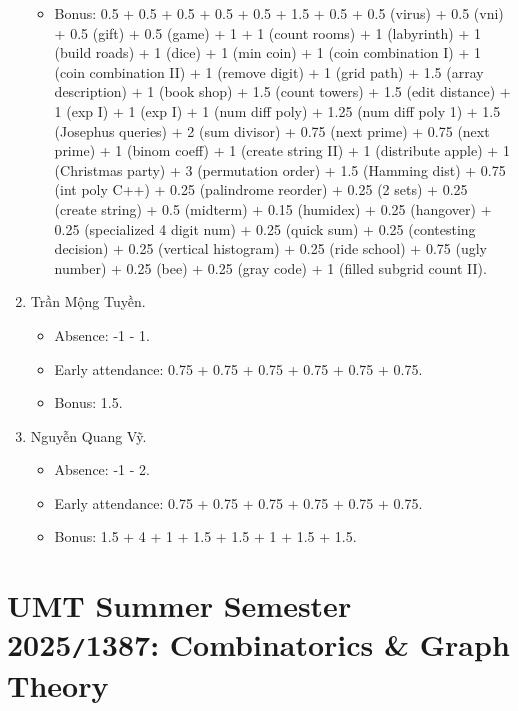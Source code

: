 \documentclass{article}
\begin{document}
\begin{enumerate}
\begin{itemize}
		\item Bonus: 0.5 + 0.5 + 0.5 + 0.5 + 0.5 + 1.5 + 0.5 + 0.5 (virus) + 0.5 (vni) + 0.5 (gift) + 0.5 (game) + 1 + 1 (count rooms) + 1 (labyrinth) + 1 (build roads) + 1 (dice) + 1 (min coin) + 1 (coin combination I) + 1 (coin combination II) + 1 (remove digit) + 1 (grid path) + 1.5 (array description) + 1 (book shop) + 1.5 (count towers) + 1.5 (edit distance) + 1 (exp I) + 1 (exp I) + 1 (num diff poly) + 1.25 (num diff poly 1) + 1.5 (Josephus queries) + 2 (sum divisor) + 0.75 (next prime) + 0.75 (next prime) + 1 (binom coeff) + 1 (create string II) + 1 (distribute apple) + 1 (Christmas party) + 3 (permutation order) + 1.5 (Hamming dist) + 0.75 (int poly C++)  + 0.25 (palindrome reorder) + 0.25 (2 sets) + 0.25 (create string) + 0.5 (midterm) + 0.15 (humidex) + 0.25 (hangover) + 0.25 (specialized 4 digit num) + 0.25 (quick sum)  + 0.25 (contesting decision) + 0.25 (vertical histogram) + 0.25 (ride school) + 0.75 (ugly number) + 0.25 (bee) + 0.25 (gray code) + 1 (filled subgrid count II).
	\end{itemize}
	\item {\sc Trần Mộng Tuyền.}
	\begin{itemize}
		\item Absence: -1 - 1.
		\item Early attendance: 0.75 + 0.75 + 0.75 + 0.75 + 0.75 + 0.75.
        \item Bonus: 1.5.
	\end{itemize}
	\item {\sc Nguyễn Quang Vỹ.}
	\begin{itemize}
		\item Absence: -1 - 2.
		\item Early attendance: 0.75 + 0.75 + 0.75 + 0.75 + 0.75 + 0.75.
		\item Bonus: 1.5 + 4 + 1 + 1.5 + 1.5 + 1 + 1.5 + 1.5.
	\end{itemize}
\end{enumerate}


\section{UMT Summer Semester 2025{\tt/}1387: Combinatorics \& Graph Theory}
\end{document}
